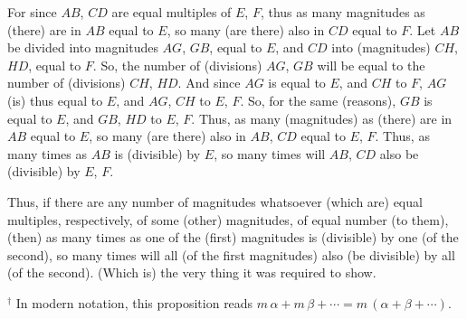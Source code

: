 \begin{Parallel}{}{}
{\epsfysize=0.6in
\centerline{}

For since $AB$, $CD$ are equal multiples of $E$, $F$, thus as many
magnitudes as (there) are in  $AB$ equal to $E$, so many (are there) also in $CD$ equal to $F$. Let $AB$ be divided into magnitudes $AG$, $GB$, equal to $E$,
and $CD$ into (magnitudes) $CH$, $HD$, equal to $F$. So, the number of (divisions)
$AG$, $GB$ will be equal to the number of (divisions) $CH$, $HD$. And since
$AG$ is equal to $E$, and $CH$ to $F$,   $AG$ (is)  thus equal to $E$, and $AG$, $CH$ to
$E$, $F$. So, for the same (reasons), $GB$ is equal to $E$, and $GB$, $HD$ to $E$, $F$.
Thus, as many (magnitudes) as (there) are in $AB$ equal to $E$, so many (are there)
also in $AB$, $CD$ equal to $E$, $F$. Thus, as many times as $AB$ is (divisible) by $E$, so many
times will $AB$, $CD$ also be (divisible)  by $E$, $F$.

Thus, if there are any number of magnitudes whatsoever (which are) equal multiples, respectively, of
some (other) magnitudes,  of  equal  number (to them), (then) as many times as one of the (first) magnitudes is (divisible) by one (of the second), so many times
will all (of the first magnitudes) also (be divisible) by all (of the second). (Which is)
the very thing it was required to show.}
\end{Parallel}
{\footnotesize \noindent$^\dag$ In modern notation, this proposition
reads $m\,\alpha + m\,\beta +\cdots= m\,(\alpha+\beta+\cdots)$.}

